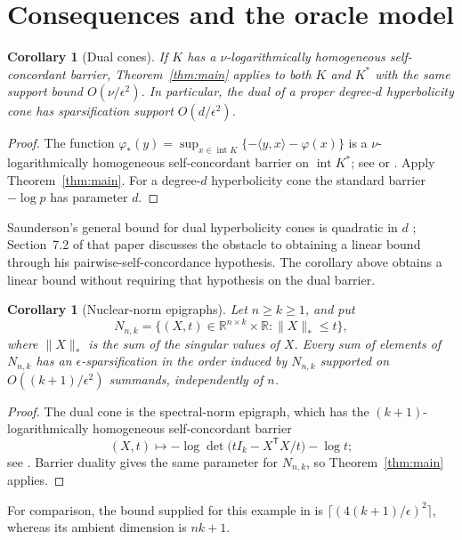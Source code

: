\documentclass[11pt]{article}
\newtheorem{corollary}[theorem]{Corollary}
\newcommand{\R}{\mathbb R}
\newcommand{\intr}{\operatorname{int}}
\begin{document}
\section{Consequences and the oracle model}

\begin{corollary}[Dual cones]\label{cor:dual}
If $K$ has a $\nu$-logarithmically homogeneous self-concordant barrier,
Theorem~\ref{thm:main} applies to both $K$ and $K^*$ with the same
support bound $O(\nu/\epsilon^2)$.
In particular, the dual of a proper degree-$d$ hyperbolicity cone has
sparsification support $O(d/\epsilon^2)$.
\end{corollary}
\begin{proof}
The function
$\varphi_*(y)=\sup_{x\in\intr K}\{-\langle y,x\rangle-\varphi(x)\}$
is a $\nu$-logarithmically homogeneous self-concordant barrier on
$\intr K^*$; see \cite[Theorem~2.4.4]{NN94} or
\cite[Theorem~7.1]{Saunderson25}. Apply Theorem~\ref{thm:main}.
For a degree-$d$ hyperbolicity cone the standard barrier $-\log p$
has parameter $d$.
\end{proof}

Saunderson's general bound for dual hyperbolicity cones is quadratic
in $d$ \cite[Corollary~7.2]{Saunderson25}; Section~7.2 of that paper
discusses the obstacle to obtaining a linear bound through his
pairwise-self-concordance hypothesis. The corollary above obtains a
linear bound without requiring that hypothesis on the dual barrier.

\begin{corollary}[Nuclear-norm epigraphs]\label{cor:nuclear}
Let $n\ge k\ge1$, and put
\[
 N_{n,k}=\{(X,t)\in\R^{n\times k}\times\R:\|X\|_*\le t\},
\]
where $\|X\|_*$ is the sum of the singular values of $X$.
Every sum of elements of $N_{n,k}$ has an $\epsilon$-sparsification
in the order induced by $N_{n,k}$ supported on
$O((k+1)/\epsilon^2)$ summands, independently of $n$.
\end{corollary}
\begin{proof}
The dual cone is the spectral-norm epigraph, which has the
$(k+1)$-logarithmically homogeneous self-concordant barrier
\[
 (X,t)\longmapsto
 -\log\det\bigl(tI_k-X^{\mathsf T}X/t\bigr)-\log t;
\]
see \cite[Section~7.3]{Saunderson25}. Barrier duality gives the same
parameter for $N_{n,k}$, so Theorem~\ref{thm:main} applies.
\end{proof}

For comparison, the bound supplied for this example in
\cite[Section~7.3]{Saunderson25} is
$\lceil(4(k+1)/\epsilon)^2\rceil$, whereas its ambient dimension is
$nk+1$.
\end{document}
